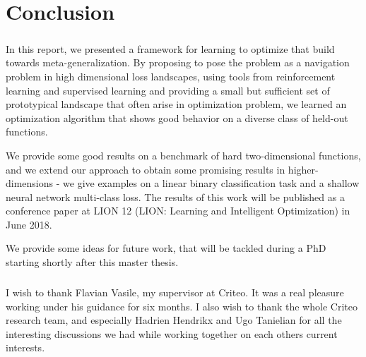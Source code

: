 \chapter{Conclusion}
	{
		
		\paragraph{} In this report, we presented a framework for learning to optimize that build towards meta-generalization. By proposing to pose the problem as a navigation problem in high dimensional loss landscapes, using tools from reinforcement learning and supervised learning and providing a small but sufficient set of prototypical landscape that often arise in optimization problem, we learned an optimization algorithm that shows good behavior on a diverse class of held-out functions. 
		
		We provide some good results on a benchmark of hard two-dimensional functions, and we extend our approach to obtain some promising results in higher-dimensions - we give examples on a linear binary classification task and a shallow neural network multi-class loss. The results of this work will be published as a conference paper at LION 12 (LION: Learning and Intelligent Optimization) in June 2018. 
		
		We provide some ideas for future work, that will be tackled during a PhD starting shortly after this master thesis. 
		
		\paragraph{} I wish to thank Flavian Vasile, my supervisor at Criteo. It was a real pleasure working under his guidance for six months. I also wish to thank the whole Criteo research team, and especially Hadrien Hendrikx and Ugo Tanielian for all the interesting discussions we had while working together on each others current interests. 
	}